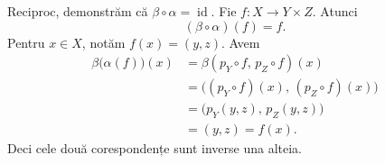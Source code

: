 \medskip
\noindent Reciproc, demonstrăm că $\beta\circ\alpha=\operatorname{id}$.
Fie $f:X\to Y\times Z$. Atunci
\[
 (\beta\circ\alpha)(f)=f.
\]
Pentru $x\in X$, notăm $f(x)=(y,z)$. Avem
\[
\begin{aligned}
 \beta\bigl(\alpha(f)\bigr)(x)
   &=\beta(p_Y\circ f,\,p_Z\circ f)(x)\\
   &=\bigl((p_Y\circ f)(x),\,(p_Z\circ f)(x)\bigr)\\
   &=\bigl(p_Y(y,z),\,p_Z(y,z)\bigr)\\
   &=(y,z)=f(x).
\end{aligned}
\]
Deci cele două corespondențe sunt inverse una alteia.

